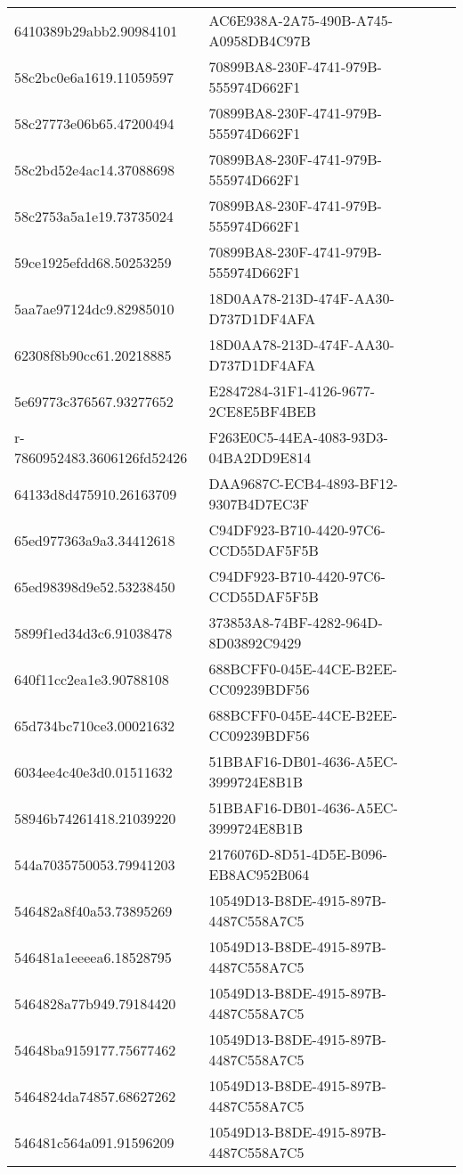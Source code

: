 \begin{tabular}{ll}
6410389b29abb2.90984101 & AC6E938A-2A75-490B-A745-A0958DB4C97B \\
58c2bc0e6a1619.11059597 & 70899BA8-230F-4741-979B-555974D662F1 \\
58c27773e06b65.47200494 & 70899BA8-230F-4741-979B-555974D662F1 \\
58c2bd52e4ac14.37088698 & 70899BA8-230F-4741-979B-555974D662F1 \\
58c2753a5a1e19.73735024 & 70899BA8-230F-4741-979B-555974D662F1 \\
59ce1925efdd68.50253259 & 70899BA8-230F-4741-979B-555974D662F1 \\
5aa7ae97124dc9.82985010 & 18D0AA78-213D-474F-AA30-D737D1DF4AFA \\
62308f8b90cc61.20218885 & 18D0AA78-213D-474F-AA30-D737D1DF4AFA \\
5e69773c376567.93277652 & E2847284-31F1-4126-9677-2CE8E5BF4BEB \\
r-7860952483.3606126fd52426 & F263E0C5-44EA-4083-93D3-04BA2DD9E814 \\
64133d8d475910.26163709 & DAA9687C-ECB4-4893-BF12-9307B4D7EC3F \\
65ed977363a9a3.34412618 & C94DF923-B710-4420-97C6-CCD55DAF5F5B \\
65ed98398d9e52.53238450 & C94DF923-B710-4420-97C6-CCD55DAF5F5B \\
5899f1ed34d3c6.91038478 & 373853A8-74BF-4282-964D-8D03892C9429 \\
640f11cc2ea1e3.90788108 & 688BCFF0-045E-44CE-B2EE-CC09239BDF56 \\
65d734bc710ce3.00021632 & 688BCFF0-045E-44CE-B2EE-CC09239BDF56 \\
6034ee4c40e3d0.01511632 & 51BBAF16-DB01-4636-A5EC-3999724E8B1B \\
58946b74261418.21039220 & 51BBAF16-DB01-4636-A5EC-3999724E8B1B \\
544a7035750053.79941203 & 2176076D-8D51-4D5E-B096-EB8AC952B064 \\
546482a8f40a53.73895269 & 10549D13-B8DE-4915-897B-4487C558A7C5 \\
546481a1eeeea6.18528795 & 10549D13-B8DE-4915-897B-4487C558A7C5 \\
5464828a77b949.79184420 & 10549D13-B8DE-4915-897B-4487C558A7C5 \\
54648ba9159177.75677462 & 10549D13-B8DE-4915-897B-4487C558A7C5 \\
5464824da74857.68627262 & 10549D13-B8DE-4915-897B-4487C558A7C5 \\
546481c564a091.91596209 & 10549D13-B8DE-4915-897B-4487C558A7C5 \\

\end{tabular}

